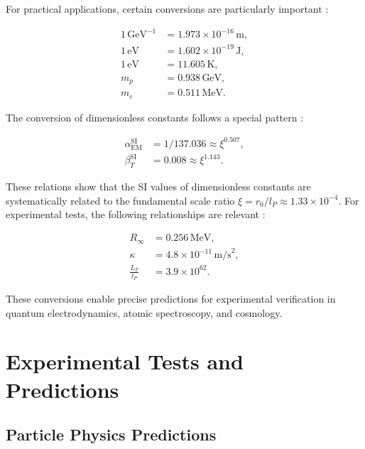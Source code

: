 \documentclass[twocolumn,aps,prl]{revtex4-2}
\begin{document}
	For practical applications, certain conversions are particularly important \cite{pascher_alpha_2025}:
	
	\begin{align}
		1 \, \text{GeV}^{-1} &= 1.973 \times 10^{-16} \, \text{m}, \label{eq:gev_to_m} \\
		1 \, \text{eV} &= 1.602 \times 10^{-19} \, \text{J}, \label{eq:ev_to_j} \\
		1 \, \text{eV} &= 11.605 \, \text{K}, \label{eq:ev_to_k} \\
		m_p &= 0.938 \, \text{GeV}, \label{eq:proton_mass} \\
		m_e &= 0.511 \, \text{MeV}. \label{eq:electron_mass}
	\end{align}
	
	The conversion of dimensionless constants follows a special pattern \cite{pascher_beta_2025}:
	
	\begin{align}
		\alpha_{\text{EM}}^{\text{SI}} &= 1/137.036 \approx \xi^{0.507}, \label{eq:alpha_em_si} \\
		\beta_T^{\text{SI}} &= 0.008 \approx \xi^{1.143}. \label{eq:beta_t_si}
	\end{align}
	
	These relations show that the SI values of dimensionless constants are systematically related to the fundamental scale ratio $\xi = r_0/l_P \approx 1.33 \times 10^{-4}$. For experimental tests, the following relationships are relevant \cite{pascher_alpha_2025}:
	
	\begin{align}
		R_{\infty} &= 0.256 \, \text{MeV}, \label{eq:rydberg} \\
		\kappa &= 4.8 \times 10^{-11} \, \text{m/s}^2, \label{eq:kappa} \\
		\frac{L_T}{l_P} &= 3.9 \times 10^{62}. \label{eq:lt_to_lp}
	\end{align}
	
	These conversions enable precise predictions for experimental verification in quantum electrodynamics, atomic spectroscopy, and cosmology.
	
	\section{Experimental Tests and Predictions}
	\label{sec:outlook}
	
	\subsection{Particle Physics Predictions}
	\label{subsec:particle_predictions}
	
\end{document}
